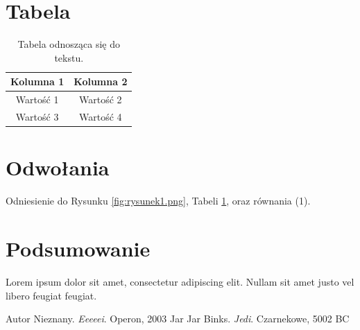 \documentclass{article}
\begin{document}
\section{Tabela}
\begin{table}[h]
    \centering
    \begin{tabular}{|c|c|}
        \hline
        Kolumna 1 & Kolumna 2 \\
        \hline
        Wartość 1 & Wartość 2 \\
        \hline
        Wartość 3 & Wartość 4 \\
        \hline
    \end{tabular}
    \caption{Tabela odnosząca się do tekstu.}
    \label{tab:tabela1}
\end{table}

\section{Odwołania}
Odniesienie do Rysunku \ref{fig:rysunek1.png}, Tabeli \ref{tab:tabela1}, oraz równania (1).

\section{Podsumowanie}
Lorem ipsum dolor sit amet, consectetur adipiscing elit. Nullam sit amet justo vel libero feugiat feugiat.

\begin{thebibliography}{9}
     Autor Nieznany. \emph{Eeeeei}. Operon, 2003
     Jar Jar Binks. \emph{Jedi}. Czarnekowe, 5002 BC
\end{thebibliography}
\end{document}
